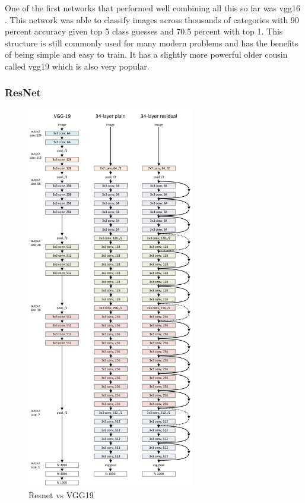 One of the first networks that performed well combining all this so far was vgg16 \cite{pateria1990enhanced}. This network was able to classify images across thousands of categories with 90 percent accuracy given top 5 class guesses and 70.5 percent with top 1. This structure is still commonly used for many modern problems and has the benefits of being simple and easy to train. It has a slightly more powerful older cousin called vgg19 which is also very popular.

\subsubsection{ResNet}\label{s:imagenet-resnet}
\begin{figure}[H]
	\centering
	\includegraphics[width=0.65\textwidth]{images/resnetvsvgg}
	\caption{Resnet vs VGG19}
	\label{f:imagenet-resnet}
\end{figure}

